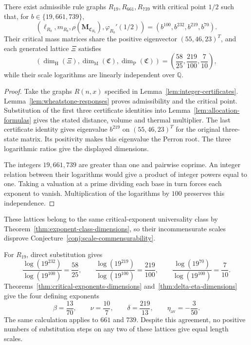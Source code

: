 \begin{theorem}\label{thm:incommensurate-class}
There exist admissible rule graphs $R_{19},R_{661},R_{739}$ with critical point $1/2$ such that, for $b\in\{19,661,739\}$,
\[
 (\ell_{R_b},m_{R_b},\rho(\mathbf M_{\mathfrak C_{R_b}}),\varphi_{R_b}'(1/2))
 =(b^{100},b^{232},b^{219},b^{70}).
\]
Their critical mass matrices share the positive eigenvector $(55,46,23)^T$, and each generated lattice $\Xi$ satisfies
\[
 (\dim_{\mathrm H}(\Xi),\dim_{\mathrm M}(\mathfrak C),\dim_{\mathrm P}(\mathfrak C))
 =\left(\frac{58}{25},\frac{219}{100},\frac7{10}\right),
\]
while their scale logarithms are linearly independent over $\mathbb Q$.
\end{theorem}
\begin{proof}
Take the graphs $R(n,x)$ specified in Lemma~\ref{lem:integer-certificates}. Lemma~\ref{lem:wheatstone-responses} proves admissibility and the critical point. Substitution of the first three certificate identities into Lemma~\ref{lem:allocation-formulas} gives the stated distance, volume and thermal multiplier. The last certificate identity gives eigenvalue $b^{219}$ on $(55,46,23)^T$ for the original three-state matrix. Its positivity makes this eigenvalue the Perron root. The three logarithmic ratios give the displayed dimensions.

The integers $19,661,739$ are greater than one and pairwise coprime. An integer relation between their logarithms would give a product of integer powers equal to one. Taking a valuation at a prime dividing each base in turn forces each exponent to vanish. Multiplication of the logarithms by $100$ preserves this independence.
\end{proof}

These lattices belong to the same critical-exponent universality class by Theorem~\ref{thm:exponent-class-dimensions}, so their incommensurate scales disprove Conjecture~\ref{conj:scale-commensurability}.

\begin{example}
For $R_{19}$, direct substitution gives
\[
 \frac{\log(19^{232})}{\log(19^{100})}=\frac{58}{25},\qquad
 \frac{\log(19^{219})}{\log(19^{100})}=\frac{219}{100},\qquad
 \frac{\log(19^{70})}{\log(19^{100})}=\frac7{10}.
\]
Theorems~\ref{thm:critical-exponents-dimensions} and~\ref{thm:delta-eta-dimensions} give the four defining exponents
\[
 \beta=\frac{13}{70},\qquad
 \nu=\frac{10}{7},\qquad
 \delta=\frac{219}{13},\qquad
 \eta_{\mathrm{av}}=-\frac3{50}.
\]
The same calculation applies to $661$ and $739$. Despite this agreement, no positive numbers of substitution steps on any two of these lattices give equal length scales.
\end{example}

